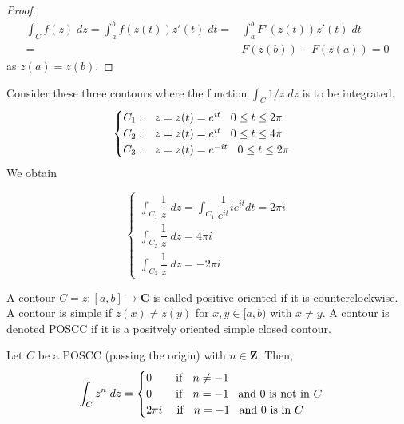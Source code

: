 \vspace{2ex}
\begin{proof}
\begin{align*}
\int _{C}f(z)\;dz=\int ^{b}_{a}f(z(t))z'(t)\;dt=&\int ^{b}_{a}F'(z(t))z'(t)\;dt\\
=&F(z(b))-F(z(a))=0
\end{align*}
as $z(a)=z(b)$. 
\end{proof}
\vspace{2ex}
\begin{ex}
Consider these three contours where the function $\int _{C}1/z\;dz$ is to be integrated.
\[\begin{cases}
	C_1:\hspace{2ex}z=z(t)=e^{it}\hspace{2ex}0\leq t\leq 2\pi \\
	C_2:\hspace{2ex}z=z(t)=e^{it}\hspace{2ex}0\leq t\leq 4\pi \\
	C_3:\hspace{2ex}z=z(t)=e^{-it}\hspace{2ex}0\leq t\leq 2\pi 
\end{cases}\]
We obtain
\begin{spacing}{2}
\[\begin{cases}
\int _{C_1}\dfrac{1}{z}\;dz=\int _{C_1}\dfrac{1}{e^{it}}ie^{it}dt=2\pi i\\
\int _{C_2}\dfrac{1}{z}\;dz=4\pi i\\
\int_{C_{3}}\dfrac{1}{z}\;dz=-2\pi i
\end{cases}\]
\end{spacing}
\end{ex}
\vspace{2ex}
\begin{defi}
	A contour $C=z:[a,b]\rightarrow {\bm C}$ is called positive oriented if it is counterclockwise. A contour is simple if $z(x)\ne z(y)$ for $x,y\in [a,b)$ with $x\ne y$. A contour is denoted POSCC if it is a positvely oriented simple closed contour.
\end{defi}
\vspace{2ex}
\begin{defi}
Let $C$ be a POSCC (passing the origin) with $n\in {\bm Z}$. Then,
\[\int _{C}z^{n}\;dz=
\begin{cases}
	0\hspace{5ex}\mathrm{if}\hspace{2ex}n\ne -1\\
	0\hspace{5ex}\mathrm{if}\hspace{2ex}n=-1\hspace{2ex}\mathrm{and\ 0\ is\ not\ in\ }C\\
2\pi i\hspace{3ex}\mathrm{if}\hspace{2ex}n=-1\hspace{2ex}\mathrm{and\ 0\ is\ in\ }C
\end{cases}
\]

\end{defi}
\vspace{2ex}

